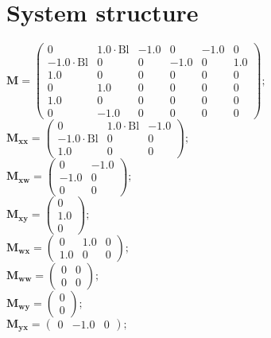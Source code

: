 \documentclass[11pt, oneside]{article}      %
\begin{document}
\section{System structure}
%

%
$ \mathbf{M} = \left(\begin{array}{cccccc}0 & 1.0 \cdot \mathrm{Bl} & -1.0 & 0 & -1.0 & 0\\- 1.0 \cdot \mathrm{Bl} & 0 & 0 & -1.0 & 0 & 1.0\\1.0 & 0 & 0 & 0 & 0 & 0\\0 & 1.0 & 0 & 0 & 0 & 0\\1.0 & 0 & 0 & 0 & 0 & 0\\0 & -1.0 & 0 & 0 & 0 & 0\end{array}\right) ; $ 
%
\\
%
$ \mathbf{M_{xx}} = \left(\begin{array}{ccc}0 & 1.0 \cdot \mathrm{Bl} & -1.0\\- 1.0 \cdot \mathrm{Bl} & 0 & 0\\1.0 & 0 & 0\end{array}\right) ; $ 
%
\\
%
$ \mathbf{M_{xw}} = \left(\begin{array}{cc}0 & -1.0\\-1.0 & 0\\0 & 0\end{array}\right) ; $ 
%
\\
%
$ \mathbf{M_{xy}} = \left(\begin{array}{c}0\\1.0\\0\end{array}\right) ; $ 
%
\\
%
$ \mathbf{M_{wx}} = \left(\begin{array}{ccc}0 & 1.0 & 0\\1.0 & 0 & 0\end{array}\right) ; $ 
%
\\
%
$ \mathbf{M_{ww}} = \left(\begin{array}{cc}0 & 0\\0 & 0\end{array}\right) ; $ 
%
\\
%
$ \mathbf{M_{wy}} = \left(\begin{array}{c}0\\0\end{array}\right) ; $ 
%
\\
%
$ \mathbf{M_{yx}} = \left(\begin{array}{ccc}0 & -1.0 & 0\end{array}\right) ; $ 
\end{document}

